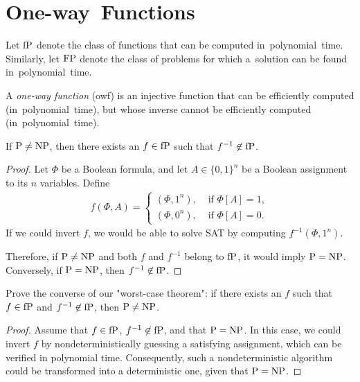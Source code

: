 
\section{One-way~Functions}\label{sec:one_way_functions}

Let $\operatorname{fP}$ denote the class of functions that can be computed in~polynomial~time.
Similarly, let $\operatorname{FP}$ denote the class of problems for which a~solution can be found in~polynomial~time.

\begin{definition}
	A \emph{one-way function} (owf) is an injective function that can be efficiently computed (in~polynomial~time), but whose inverse cannot be efficiently computed (in~polynomial~time).
\end{definition}

\begin{theorem}
    If $\operatorname{P} \neq \operatorname{NP}$, then there exists an $f \in \operatorname{fP}$ such that $f^{-1} \not\in \operatorname{fP}$.
\end{theorem}

\begin{proof}
    Let $\Phi$ be a Boolean formula, and let $A \in \{0, 1\}^n$ be a Boolean assignment to its $n$ variables.
    Define
    \begin{align*}
        f(\Phi, A) = \begin{cases}
        (\Phi, 1^n), &\text{ if } \Phi[A]=1, \\
        (\Phi, 0^n), &\text{ if } \Phi[A]=0.
        \end{cases}
    \end{align*}
    If we could invert $f$, we would be able to solve SAT by computing $f^{-1}(\Phi, 1^n)$.

    Therefore, if $\operatorname{P} \neq \operatorname{NP}$ and both $f$ and $f^{-1}$ belong to $\operatorname{fP}$, it would imply $\operatorname{P} = \operatorname{NP}$.
    Conversely, if $\operatorname{P} = \operatorname{NP}$, then $f^{-1} \not\in \operatorname{fP}$.
\end{proof}

\begin{exercise}
	Prove the converse of our "worst-case theorem": if there exists an $f$ such that $f \in  \operatorname{fP}$ and $f^{-1} \not\in \operatorname{fP}$, then $\operatorname{P} \neq \operatorname{NP}$.
\end{exercise}

\begin{proof}
	Assume that $f \in  \operatorname{fP}$, $f^{-1} \not\in  \operatorname{fP}$, and that $\operatorname{P} = \operatorname{NP}$.
	In this case, we could invert $f$ by nondeterministically guessing a satisfying assignment, which can be verified in polynomial time.
	Consequently, such a nondeterministic algorithm could be transformed into a deterministic one, given that $\operatorname{P} = \operatorname{NP}$.
\end{proof}


